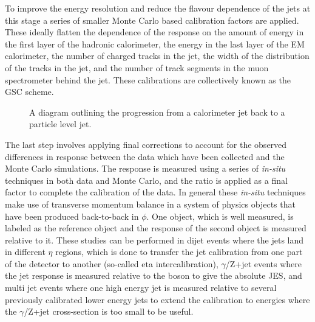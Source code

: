 To improve the energy resolution and reduce the flavour dependence of the jets at this stage a series of smaller Monte Carlo based calibration factors are applied.  
These ideally flatten the dependence of the response on the amount of energy in the first layer of the hadronic calorimeter, the energy in the last layer of the EM calorimeter, the number of charged tracks in the jet, the width of the distribution of the tracks in the jet, and the number of track segments in the muon spectrometer behind the jet.  
These calibrations are collectively known as the \gls{GSC} scheme.  

\begin{figure}[!ht]
  \begin{center}
  \end{center}
  \caption[Jet calibration sequence used by ATLAS.]
      {\small A diagram outlining the progression from a calorimeter jet back to a particle level jet.  }
  \label{Fig:JetCalibSequenceFig}
\end{figure}


The last step involves applying final corrections to account for the observed differences in response between the data which have been collected and the Monte Carlo simulations.  
The response is measured using a series of \textit{in-situ} techniques in both data and Monte Carlo, and the ratio is applied as a final factor to complete the calibration of the data.  
In general these \textit{in-situ} techniques make use of transverse momentum balance in a system of physics objects that have been produced back-to-back in $\phi$.  
One object, which is well measured, is labeled as the reference object and the response of the second object is measured relative to it.  
These studies can be performed in dijet events where the jets land in different $\eta$ regions, which is done to transfer the jet calibration from one part of the detector to another (so-called eta intercalibration), $\gamma$/Z+jet events where the jet response is measured relative to the boson to give the absolute JES, and multi jet events where one high energy jet is measured relative to several previously calibrated lower energy jets to extend the calibration to energies where the $\gamma$/Z+jet cross-section is too small to be useful.  

